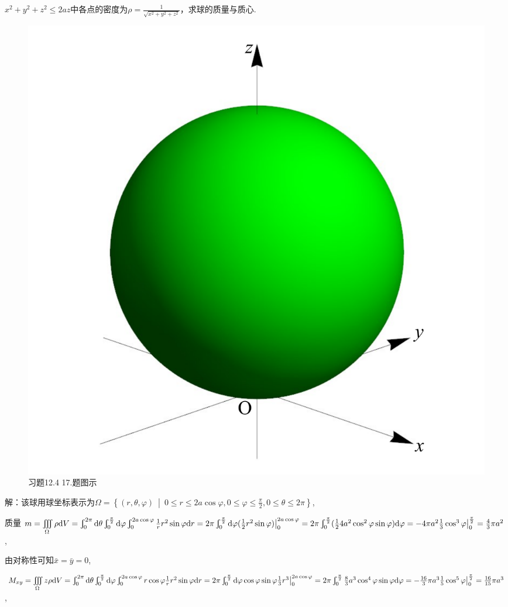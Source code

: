 \documentclass[12pt,UTF8]{ctexart}
\newcommand\Set[2]{\left\{#1\ \middle\vert\ #2 \right\}}
\newcommand{\Int}[4]{\varint\nolimits_{#1}^{#2}#3\mathrm d#4}
\newcommand{\IIInt}[3]{\iiint\limits_{#1}#2\mathrm d#3}
\begin{document}
\begin{enumerate}
$x^2+y^2+z^2\leqslant2az$中各点的密度为$\rho=\frac1{\sqrt{x^2+y^2+z^2}}$，求球的质量与质心.

\begin{figure}[H]
\begin{center}
\includegraphics[height=0.4\textheight]{Figures19/Fig12-4-17.pdf}
\end{center}
\caption{习题12.4 17.题图示}
\label{12-4-17}
\end{figure}

解：该球用球坐标表示为$\Omega=\Set{(r,\theta,\varphi)}{0\leqslant r\leqslant2a\cos\varphi,0\leqslant\varphi\leqslant\frac\pi2,0\leqslant\theta\leqslant2\pi}$,

质量$m=\IIInt\Omega\rho V=\Int0{2\pi}{}\theta\Int0{\frac\pi2}{}\varphi\Int0{2a\cos\varphi}{\frac1rr^2\sin\varphi}r=2\pi\Int0{\frac\pi2}{}\varphi(\frac12r^2\sin\varphi)\big|_0^{2a\cos\varphi}\\
=2\pi\Int0{\frac\pi2}{(\frac124a^2\cos^2\varphi\sin\varphi)}\varphi=-4\pi a^2\frac13\cos^3\varphi\big|_0^{\frac\pi2}=\frac43\pi a^2$,

由对称性可知$\bar{x}=\bar{y}=0$,

$M_{xy}=\IIInt\Omega{z\rho}V=\Int0{2\pi}{}\theta\Int0{\frac\pi2}{}\varphi\Int0{2a\cos\varphi}{r\cos\varphi\frac1rr^2\sin\varphi}r=2\pi\Int0{\frac\pi2}{}\varphi\cos\varphi\sin\varphi\frac13r^3\big|_0^{2a\cos\varphi}\\
=2\pi\Int0{\frac\pi2}{\frac83a^3\cos^4\varphi\sin\varphi}\varphi=-\frac{16}3\pi a^3\frac15\cos^5\varphi\big|_0^{\frac\pi2}=\frac{16}{15}\pi a^3$,


\end{enumerate}
\end{document}

